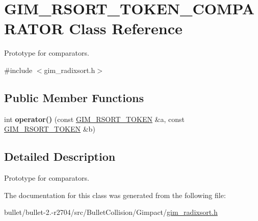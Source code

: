 \hypertarget{class_g_i_m___r_s_o_r_t___t_o_k_e_n___c_o_m_p_a_r_a_t_o_r}{\section{G\+I\+M\+\_\+\+R\+S\+O\+R\+T\+\_\+\+T\+O\+K\+E\+N\+\_\+\+C\+O\+M\+P\+A\+R\+A\+T\+O\+R Class Reference}
\label{class_g_i_m___r_s_o_r_t___t_o_k_e_n___c_o_m_p_a_r_a_t_o_r}
}


Prototype for comparators.  




{\ttfamily \#include $<$gim\+\_\+radixsort.\+h$>$}

\subsection*{Public Member Functions}
\begin{DoxyCompactItemize}
\item 
\hypertarget{class_g_i_m___r_s_o_r_t___t_o_k_e_n___c_o_m_p_a_r_a_t_o_r_acceb7639bbe849343b9bfd355def8168}{int {\bfseries operator()} (const \hyperlink{struct_g_i_m___r_s_o_r_t___t_o_k_e_n}{G\+I\+M\+\_\+\+R\+S\+O\+R\+T\+\_\+\+T\+O\+K\+E\+N} \&a, const \hyperlink{struct_g_i_m___r_s_o_r_t___t_o_k_e_n}{G\+I\+M\+\_\+\+R\+S\+O\+R\+T\+\_\+\+T\+O\+K\+E\+N} \&b)}\label{class_g_i_m___r_s_o_r_t___t_o_k_e_n___c_o_m_p_a_r_a_t_o_r_acceb7639bbe849343b9bfd355def8168}

\end{DoxyCompactItemize}


\subsection{Detailed Description}
Prototype for comparators. 

The documentation for this class was generated from the following file\+:\begin{DoxyCompactItemize}
\item 
bullet/bullet-\/2.-\/r2704/src/\+Bullet\+Collision/\+Gimpact/\hyperlink{gim__radixsort_8h}{gim\+\_\+radixsort.\+h}\end{DoxyCompactItemize}
